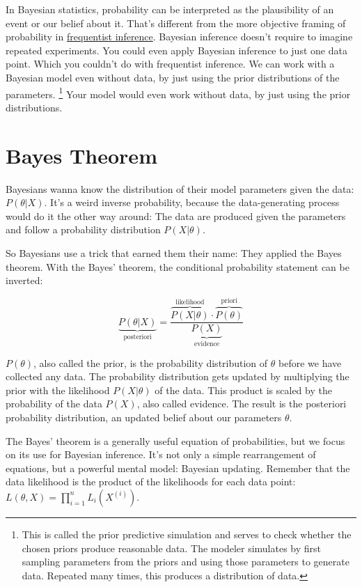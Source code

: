 \documentclass[
  10pt,
]{scrbook}
\begin{document}
In Bayesian statistics, probability can be interpreted as the plausibility of an event or our belief about it.
That's different from the more objective framing of probability in \protect\hyperlink{frequentist-inference}{frequentist inference}.
Bayesian inference doesn't require to imagine repeated experiments.
You could even apply Bayesian inference to just one data point.
Which you couldn't do with frequentist inference.
We can work with a Bayesian model even without data, by just using the prior distributions of the parameters. \footnote{This is called the prior predictive simulation and serves to check whether the chosen priors produce reasonable data. The modeler simulates by first sampling parameters from the priors and using those parameters to generate data. Repeated many times, this produces a distribution of data.}
Your model would even work without data, by just using the prior distributions.

\hypertarget{bayes-theorem}{%
\section{Bayes Theorem}\label{bayes-theorem}}

Bayesians wanna know the distribution of their model parameters given the data: \(P(\theta | X)\).
It's a weird inverse probability, because the data-generating process would do it the other way around:
The data are produced given the parameters and follow a probability distribution \(P(X | \theta)\).

So Bayesians use a trick that earned them their name: They applied the Bayes theorem.
With the Bayes' theorem, the conditional probability statement can be inverted:

\[\underbrace{P(\theta|X)}_{\text{posteriori}} = \frac{\overbrace{P(X | \theta)}^{\text{likelihood}} \cdot  \overbrace{P(\theta)}^{\text{priori}}}{\underbrace{P(X)}_{\text{evidence}}}\]

\(P(\theta)\), also called the prior, is the probability distribution of \(\theta\) before we have collected any data.
The probability distribution gets updated by multiplying the prior with the likelihood \(P(X | \theta)\) of the data.
This product is scaled by the probability of the data \(P(X)\), also called evidence.
The result is the posteriori probability distribution, an updated belief about our parameters \(\theta\).

The Bayes' theorem is a generally useful equation of probabilities, but we focus on its use for Bayesian inference.
It's not only a simple rearrangement of equations, but a powerful mental model: Bayesian updating.
Remember that the data likelihood is the product of the likelihoods for each data point:
\(L(\theta, X) = \prod_{i=1}^n L_i(X^{(i)})\).
\end{document}
